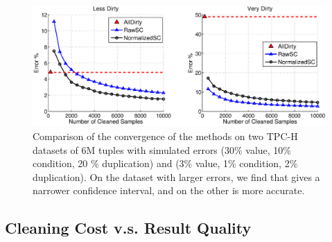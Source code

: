 \begin{figure}[t]
\hspace*{-2em}
\includegraphics[scale=0.28]{exp/allerror-samplesize.eps}\vspace{-1em}
\caption{Comparison of the convergence of the methods on two TPC-H datasets of 6M tuples with simulated errors (30\% value, 10\% condition, 20 \% duplication) and (3\% value, 1\% condition, 2\% duplication). On the dataset with larger errors, we find that \sampleclean gives a narrower confidence interval, and on the other \biascorrected is more accurate. }\vspace{-1em}
\label{exp:error-samplesize}
\end{figure}

\subsection{Cleaning Cost v.s. Result Quality}



